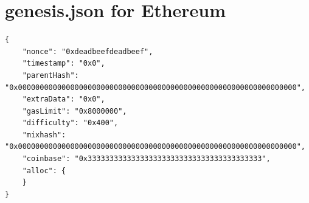 \documentclass[a4paper,twoside,phd]{BYUPhys}
\begin{document}
\chapter{genesis.json for Ethereum}
\begin{lstlisting}
{
    "nonce": "0xdeadbeefdeadbeef",
    "timestamp": "0x0",
    "parentHash": "0x0000000000000000000000000000000000000000000000000000000000000000",
    "extraData": "0x0",
    "gasLimit": "0x8000000",
    "difficulty": "0x400",
    "mixhash": "0x0000000000000000000000000000000000000000000000000000000000000000",
    "coinbase": "0x3333333333333333333333333333333333333333",
    "alloc": {
    }
}
\end{lstlisting}


\end{document}
